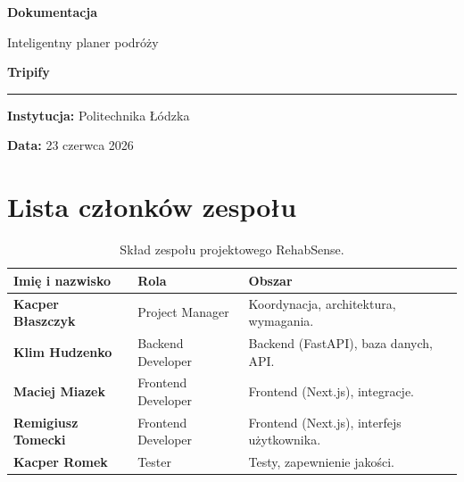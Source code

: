 \documentclass[11pt,a4paper]{article}
\begin{document}
\begin{titlepage}
\centering
\vspace*{2cm}
{\Huge\bfseries\color{primary} Dokumentacja\par}
\vspace{0.5cm}
{\LARGE Inteligentny planer podróży\par}
\vspace{0.3cm}
{\Huge\bfseries Tripify\par}
\vspace{1.2cm}
\rule{0.7\textwidth}{1.2pt}\par
\vspace{1.2cm}
{\large\textbf{Instytucja:} Politechnika Łódzka\par}
\vspace{0.4cm}
{\large\textbf{Data:} 23 czerwca 2026\par}
\end{titlepage}

\section*{Lista członków zespołu}
\begin{table}[ht]
\centering
\begin{tabularx}{\textwidth}{>{\bfseries}p{4.2cm} p{3.5cm} Y}
\toprule
\textbf{Imię i nazwisko} & \textbf{Rola} & \textbf{Obszar} \\
\midrule
Kacper Błaszczyk & Project Manager & Koordynacja, architektura, wymagania. \\
Klim Hudzenko & Backend Developer & Backend (FastAPI), baza danych, API. \\
Maciej Miazek & Frontend Developer & Frontend (Next.js), integracje. \\
Remigiusz Tomecki & Frontend Developer & Frontend (Next.js), interfejs użytkownika. \\
Kacper Romek & Tester & Testy, zapewnienie jakości. \\
\bottomrule
\end{tabularx}
\caption{Skład zespołu projektowego RehabSense.}
\end{table}
\newpage

\tableofcontents
\newpage

\end{document}
